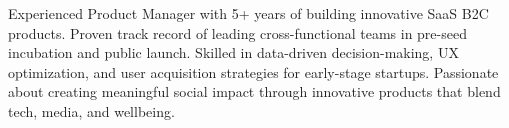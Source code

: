 


Experienced Product Manager with 5+ years of building innovative SaaS B2C products. Proven track record of leading cross-functional teams in pre-seed incubation
and public launch. Skilled in data-driven decision-making, UX optimization, and user acquisition strategies for early-stage startups.
Passionate about creating meaningful social impact through innovative products that blend tech, media, and wellbeing.


%

